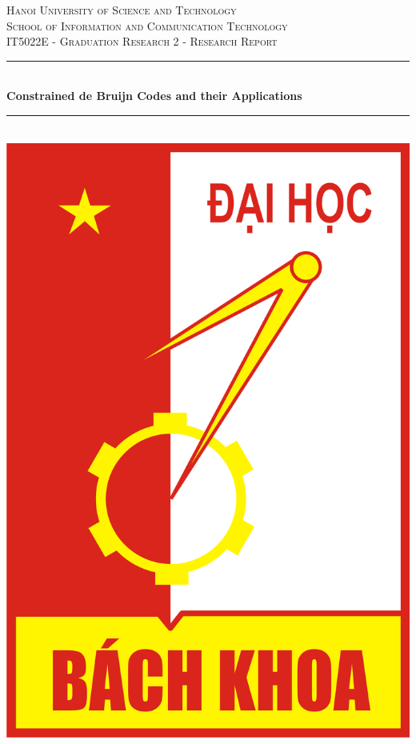 \begin{titlepage}

\newcommand{\HRule}{\rule{\linewidth}{0.5mm}}
\center 

\textsc{\large Hanoi University of Science and Technology\\} 
\textsc{School of Information and Communication Technology}\\[1.5cm] 
\textsc{\large IT5022E - Graduation Research 2 - Research Report}\\[0.5cm] 

\HRule \\[0.4cm]
{ \huge \bfseries  
Constrained de Bruijn Codes and their Applications}\\[0.4cm] 
\HRule \\[1.5cm]

\includegraphics[scale=0.3]{Images/Logo_Hust.png}\\[1cm]


\end{titlepage}
